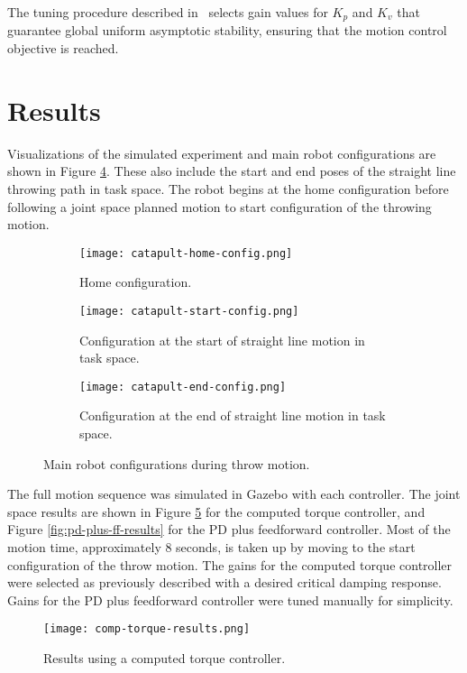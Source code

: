 \documentclass[conference]{IEEEtran}
\begin{document}
The tuning procedure described in~\cite{kelly2007control} selects gain values for $K_p$
and $K_v$ that guarantee global uniform asymptotic stability, ensuring that the
motion control objective is reached.


\section{Results}
Visualizations of the simulated experiment and main robot configurations are
shown in Figure \ref{fig:configs}. These also include the start and end poses of
the straight line throwing path in task space. The robot begins at the home
configuration before following a joint space planned motion to start
configuration of the throwing motion.

\begin{figure}[!t]
  \begin{subfigure}{0.24\textwidth}
    \texttt{[image: catapult-home-config.png]}
    \caption{Home configuration.}
    \label{fig:home-config}
  \end{subfigure}
  \begin{subfigure}{0.24\textwidth}
    \texttt{[image: catapult-start-config.png]}
    \caption{Configuration at the start of straight line motion in task space.}
    \label{fig:start-config}
  \end{subfigure}
  \begin{subfigure}{0.24\textwidth}
    \texttt{[image: catapult-end-config.png]}
    \caption{Configuration at the end of straight line motion in task space.}
    \label{fig:end-config}
  \end{subfigure}
  \caption{Main robot configurations during throw motion.}
  \label{fig:configs}
\end{figure}

The full motion sequence was simulated in Gazebo with each controller. The joint
space results are shown in Figure \ref{fig:comp-torque-results} for the computed
torque controller, and Figure \ref{fig:pd-plus-ff-results} for the PD plus
feedforward controller. Most of the motion time, approximately $8$ seconds, is
taken up by moving to the start configuration of the throw motion. The gains for
the computed torque controller were selected as previously described with a
desired critical damping response. Gains for the PD plus feedforward controller
were tuned manually for simplicity.

\begin{figure}[!t]
  \texttt{[image: comp-torque-results.png]}
  \caption{Results using a computed torque controller.}
  \label{fig:comp-torque-results}
\end{figure}
\end{document}
